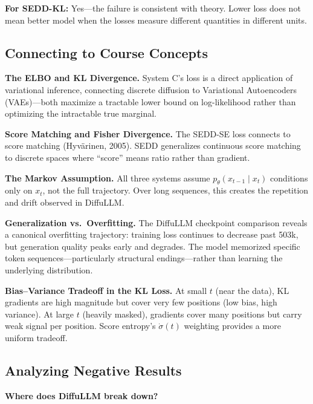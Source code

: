 \documentclass[11pt,a4paper]{article}
\begin{document}
\textbf{For SEDD-KL:} Yes---the failure is consistent with theory. Lower loss does not mean better model when the losses measure different quantities in different units.

\subsection{Connecting to Course Concepts}

\textbf{The ELBO and KL Divergence.} System C's loss is a direct application of variational inference, connecting discrete diffusion to Variational Autoencoders (VAEs)---both maximize a tractable lower bound on log-likelihood rather than optimizing the intractable true marginal.

\textbf{Score Matching and Fisher Divergence.} The SEDD-SE loss connects to score matching (Hyv\"arinen, 2005). SEDD generalizes continuous score matching to discrete spaces where ``score'' means ratio rather than gradient.

\textbf{The Markov Assumption.} All three systems assume $p_\theta(x_{t-1} \mid x_t)$ conditions only on $x_t$, not the full trajectory. Over long sequences, this creates the repetition and drift observed in DiffuLLM.

\textbf{Generalization vs.\ Overfitting.} The DiffuLLM checkpoint comparison reveals a canonical overfitting trajectory: training loss continues to decrease past 503k, but generation quality peaks early and degrades. The model memorized specific token sequences---particularly structural endings---rather than learning the underlying distribution.

\textbf{Bias--Variance Tradeoff in the KL Loss.} At small $t$ (near the data), KL gradients are high magnitude but cover very few positions (low bias, high variance). At large $t$ (heavily masked), gradients cover many positions but carry weak signal per position. Score entropy's $\dot{\sigma}(t)$ weighting provides a more uniform tradeoff.

\subsection{Analyzing Negative Results}

\textbf{Where does DiffuLLM break down?}
\end{document}

